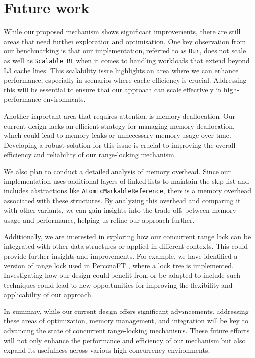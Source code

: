 \chapter{Future work}\label{chapter:futurework}

While our proposed mechanism shows significant improvements, there are still areas that need further exploration and optimization. One key observation from our benchmarking is that our implementation, referred to as \texttt{Our}, does not scale as well as \texttt{Scalable RL} when it comes to handling workloads that extend beyond L3 cache lines. This scalability issue highlights an area where we can enhance performance, especially in scenarios where cache efficiency is crucial. Addressing this will be essential to ensure that our approach can scale effectively in high-performance environments.

Another important area that requires attention is memory deallocation. Our current design lacks an efficient strategy for managing memory deallocation, which could lead to memory leaks or unnecessary memory usage over time. Developing a robust solution for this issue is crucial to improving the overall efficiency and reliability of our range-locking mechanism.

We also plan to conduct a detailed analysis of memory overhead. Since our implementation uses additional layers of linked lists to maintain the skip list and includes abstractions like \texttt{AtomicMarkableReference}, there is a memory overhead associated with these structures. By analyzing this overhead and comparing it with other variants, we can gain insights into the trade-offs between memory usage and performance, helping us refine our approach further.

Additionally, we are interested in exploring how our concurrent range lock can be integrated with other data structures or applied in different contexts. This could provide further insights and improvements. For example, we have identified a version of range lock used in PerconaFT \parencite{perconaft}, where a lock tree is implemented. Investigating how our design could benefit from or be adapted to include such techniques could lead to new opportunities for improving the flexibility and applicability of our approach.

In summary, while our current design offers significant advancements, addressing these areas of optimization, memory management, and integration will be key to advancing the state of concurrent range-locking mechanisms. These future efforts will not only enhance the performance and efficiency of our mechanism but also expand its usefulness across various high-concurrency environments.